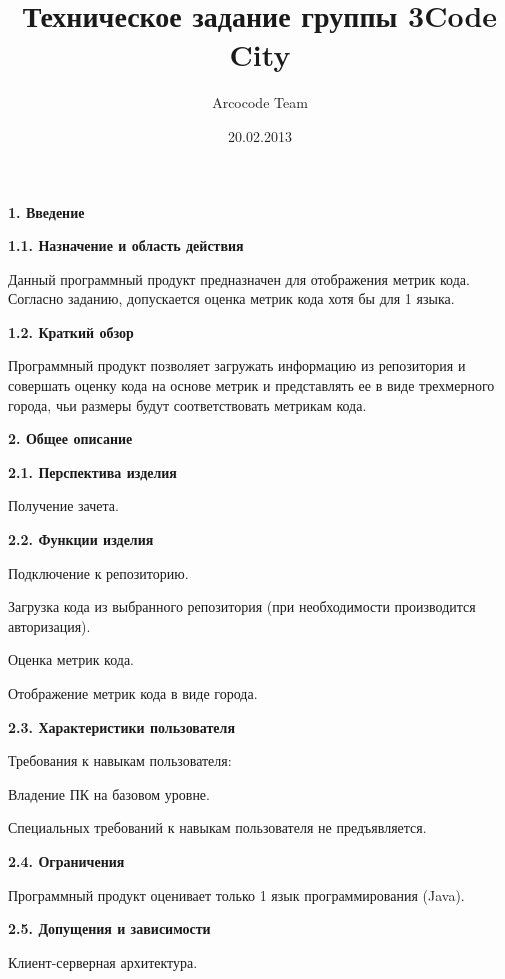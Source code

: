 \documentclass[a4paper,12pt]{article}
\title{Техническое задание группы 3\newline Code City }
\date{20.02.2013}
\author{Arcocode Team}
\begin{document}
\maketitle
\newpage
\textbf{1. Введение}
\newline

	\textbf{1.1. Назначение и область действия}
	
		Данный программный продукт предназначен для отображения метрик кода.
		Согласно заданию, допускается оценка метрик кода хотя бы для 1 языка.
	\newline	

	\textbf{1.2. Краткий обзор}
	
		Программный продукт позволяет загружать информацию из репозитория и совершать оценку кода на основе метрик и представлять ее в виде трехмерного города, 
		чьи размеры будут соответствовать метрикам кода.
\maketitle
\newpage
\textbf{2. Общее описание}
\newline

	\textbf{2.1. Перспектива изделия}
	
		Получение зачета.
		\newline
		
	\textbf{2.2. Функции изделия}
	
		Подключение к репозиторию.
		
		Загрузка кода из выбранного репозитория (при необходимости производится авторизация).
		
		Оценка метрик кода.
		
		Отображение метрик кода в виде города.	
		\newline
		
	\textbf{2.3. Характеристики пользователя}
	
		Требования к навыкам пользователя:
		
		Владение ПК на базовом уровне.
		
		Специальных требований к навыкам пользователя не предъявляется.
		\newline
		
	\textbf{2.4. Ограничения}
	
		Программный продукт оценивает только 1 язык программирования (Java).
		\newline

	\textbf{2.5. Допущения и зависимости}
	
		Клиент-серверная архитектура.
		
\end{document}
